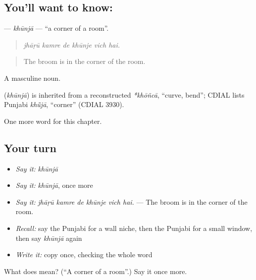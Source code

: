 \subsection*{You'll want to know: }
\textbf{} — \emph{khūnjā} — \textquotedblleft{}a corner of a room\textquotedblright{}.

\begin{quote}
     
\end{quote}

\begin{quote}
\emph{jhāṛū kamre de khūnje vich hai.}
\end{quote}

\begin{quote}
The broom is in the corner of the room.
\end{quote}

A masculine noun.

\begin{cousinweb}
\textbf{} (\emph{khūnjā}) is inherited from a reconstructed \emph{*khōñcā}, \textquotedblleft{}curve, bend\textquotedblright{}; CDIAL lists Punjabi \emph{khū̃jā}, \textquotedblleft{}corner\textquotedblright{} (CDIAL 3930).
\end{cousinweb}

\begin{grammarlens}[title={What you've built}]
One more word for this chapter.
\end{grammarlens}

\subsection*{Your turn}
\begin{itemize}
\raggedright
  \item \emph{Say it:} \emph{khūnjā}
  \item \emph{Say it:} \emph{khūnjā}, once more
  \item \emph{Say it:} \emph{jhāṛū kamre de khūnje vich hai.} — The broom is in the corner of the room.
  \item \emph{Recall:} say the Punjabi for a wall niche, then the Punjabi for a small window, then say \emph{khūnjā} again
  \item \emph{Write it:} copy \textbf{} once, checking the whole word
\end{itemize}

\begin{tcolorbox}[breakable,colback=teal!4,colframe=teal!35!black,title={Before you move on}]
What does  mean? (\textquotedblleft{}A corner of a room\textquotedblright{}.) Say it once more.
\end{tcolorbox}
